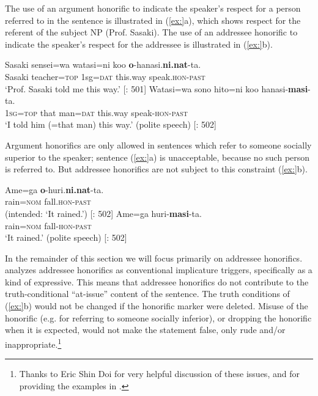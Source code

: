 The use of an argument honorific to indicate the speaker’s respect for a person referred to in the sentence is illustrated in (\ref{ex:}a), which shows respect for the referent of the subject NP (Prof. Sasaki). The use of an addressee honorific to indicate the speaker’s respect for the addressee is illustrated in (\ref{ex:}b).


\ea
\ea  \gll Sasaki  sensei=wa  watasi=ni  koo  \textbf{o}-hanasi.\textbf{ni.nat}-ta.\\
Sasaki  teacher=\textsc{top}  1sg=\textsc{dat}  this.way  speak.\textsc{hon-past}\\
\glt ‘Prof. Sasaki told me this way.’  [\citealt{Harada1976}: 501]
\ex \gll
    Watasi=wa  sono  hito=ni  koo  hanasi-\textbf{masi}-ta.\\
\textsc{1sg}=\textsc{top}  that  man=\textsc{dat}  this.way  speak-\textsc{hon-past}\\
\glt ‘I told him (=that man) this way.’  (polite speech)   [\citealt{Harada1976}: 502]
\z \z


Argument honorifics are only allowed in sentences which refer to someone socially superior to the speaker; sentence (\ref{ex:}a) is unacceptable, because no such person is referred to. But addressee honorifics are not subject to this constraint (\ref{ex:}b).


\ea \ea \gll *Ame=ga  \textbf{o}-huri.\textbf{ni.nat}-ta.\\
  rain=\textsc{nom}  fall.\textsc{hon-past}\\
\glt (intended: ‘It rained.’)  [\citealt{Harada1976}: 502]
\ex \gll
Ame=ga  huri-\textbf{masi}-ta.\\
rain=\textsc{nom}  fall-\textsc{hon-past}\\
\glt ‘It rained.’  (polite speech)   [\citealt{Harada1976}: 502]
\z \z


In the remainder of this section we will focus primarily on addressee honorifics. \citet{Potts2005} analyzes addressee honorifics as conventional implicature triggers, specifically as a kind of expressive. This means that addressee honorifics do not contribute to the truth-conditional “at-issue” content of the sentence. The truth conditions of (\ref{ex:}b) would not be changed if the honorific marker were deleted. Misuse of the honorific (e.g. for referring to someone socially inferior), or dropping the honorific when it is expected, would not make the statement false, only rude and/or inappropriate.\footnote{Thanks to Eric Shin Doi for very helpful discussion of these issues, and for providing the examples in .}



